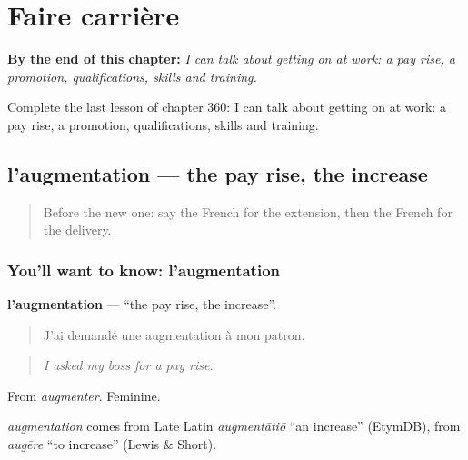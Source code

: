
\chapter{Faire carrière}
\label{ch:fr-faire-carriere}

\begin{chapteropening}
\textbf{By the end of this chapter:} \emph{I can talk about getting on at work: a pay rise, a promotion, qualifications, skills and training.}

Complete the last lesson of chapter 360: I can talk about getting on at work: a pay rise, a promotion, qualifications, skills and training.
\end{chapteropening}

\section[l'augmentation]{l'augmentation — the pay rise, the increase}

\label{lesson:FR-C360-augmentation}



\begin{quote}
Before the new one: say the French for the extension, then the French for the delivery.
\end{quote}

\subsection*{You'll want to know: l'augmentation}
\textbf{l'augmentation} — \textquotedblleft{}the pay rise, the increase\textquotedblright{}.

\begin{quote}
J'ai demandé une augmentation à mon patron.
\end{quote}

\begin{quote}
\emph{I asked my boss for a pay rise.}
\end{quote}

From \emph{augmenter}. Feminine.

\begin{cousinweb}
\emph{augmentation} comes from Late Latin \emph{augmentātiō} \textquotedblleft{}an increase\textquotedblright{} (EtymDB), from \emph{augēre} \textquotedblleft{}to increase\textquotedblright{} (Lewis \& Short).
\end{cousinweb}

